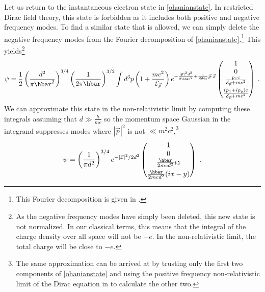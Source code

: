 \documentclass[12pt,secnumarabic,amsmath,amssymb,balancelastpage,nofootinbib]{article}
\begin{document}
Let us return to the instantaneous electron state in \eqref{ohanianstate}.  In restricted Dirac field theory, this state is forbidden as it includes both positive and negative frequency modes.  To find a similar state that is allowed, we can simply delete the negative frequency modes from the Fourier decomposition of \eqref{ohanianstate}.\footnote{This Fourier decomposition is given in \citealp[section 3.3]{bjorkendrell}.}  This yields\footnote{As the negative frequency modes have simply been deleted, this new state is not normalized.  In our classical terms, this means that the integral of the charge density over all space will not be $-e$.  In the non-relativistic limit, the total charge will be close to $-e$.}
\begin{equation}
\psi=\frac{1}{2}\left(\frac{d^2}{\pi \hbar^2}\right)^{3/4}\left(\frac{1}{2 \pi \hbar}\right)^{3/2}\int d^3 p \left(1+\frac{m c^2}{\mathcal{E}_{\vec{p}}}\right)e^{-\frac{|\vec{p}|^2 d^2}{2 \hbar^2}+\frac{i}{\hbar}\vec{p}\cdot\vec{x}}\left(\begin{matrix}
1\\
0\\
\frac{p_z c}{\mathcal{E}_{\vec{p}} + m c^2}\vspace*{4 pt}\\
\frac{(p_x+ i p_y) c}{\mathcal{E}_{\vec{p}} + m c^2}
\end{matrix}\right)\ .
\label{truestate}
\end{equation}
We can approximate this state in the non-relativistic limit by computing these integrals assuming that $d \gg \frac{\hbar}{m c}$ so the momentum space Gaussian in the integrand suppresses modes where $|\vec{p}|^2$ is not $\ll m^2 c^2$,\footnote{The same approximation can be arrived at by trusting only the first two components of \eqref{ohanianstate} and using the positive frequency non-relativistic limit of the Dirac equation in \citet[equation 1.31]{bjorkendrell} to calculate the other two.}
\begin{equation}
\psi=\left(\frac{1}{\pi d^2}\right)^{3/4}e^{-|\vec{x}|^2/2d^2}\left(\begin{matrix}
1\\
0\\
\frac{\hbar}{2 m c d^2}i z\vspace*{4 pt}\\
\frac{\hbar}{2 m c d^2}(i x-y)
\end{matrix}\right)\ .
\label{approxstate}
\end{equation}
\end{document}
